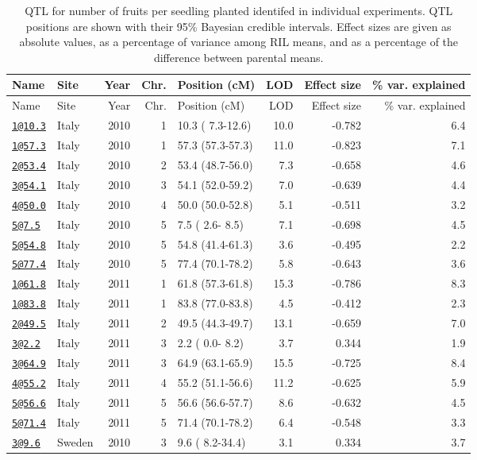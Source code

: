 \documentclass[]{article}
\begin{document}
\begin{longtable}[]{@{}llrrlrrr@{}}
\caption{QTL for number of fruits per seedling planted identifed in
individual experiments. QTL positions are shown with their 95\% Bayesian
credible intervals. Effect sizes are given as absolute values, as a
percentage of variance among RIL means, and as a percentage of the
difference between parental means.}\tabularnewline
\toprule
Name & Site & Year & Chr. & Position (cM) & LOD & Effect size & \% var.
explained\tabularnewline
\midrule
\endfirsthead
\toprule
Name & Site & Year & Chr. & Position (cM) & LOD & Effect size & \% var.
explained\tabularnewline
\midrule
\endhead
\href{mailto:1@10.3}{\nolinkurl{1@10.3}} & Italy & 2010 & 1 & 10.3 (
7.3-12.6) & 10.0 & -0.782 & 6.4\tabularnewline
\href{mailto:1@57.3}{\nolinkurl{1@57.3}} & Italy & 2010 & 1 & 57.3
(57.3-57.3) & 11.0 & -0.823 & 7.1\tabularnewline
\href{mailto:2@53.4}{\nolinkurl{2@53.4}} & Italy & 2010 & 2 & 53.4
(48.7-56.0) & 7.3 & -0.658 & 4.6\tabularnewline
\href{mailto:3@54.1}{\nolinkurl{3@54.1}} & Italy & 2010 & 3 & 54.1
(52.0-59.2) & 7.0 & -0.639 & 4.4\tabularnewline
\href{mailto:4@50.0}{\nolinkurl{4@50.0}} & Italy & 2010 & 4 & 50.0
(50.0-52.8) & 5.1 & -0.511 & 3.2\tabularnewline
\href{mailto:5@7.5}{\nolinkurl{5@7.5}} & Italy & 2010 & 5 & 7.5 ( 2.6-
8.5) & 7.1 & -0.698 & 4.5\tabularnewline
\href{mailto:5@54.8}{\nolinkurl{5@54.8}} & Italy & 2010 & 5 & 54.8
(41.4-61.3) & 3.6 & -0.495 & 2.2\tabularnewline
\href{mailto:5@77.4}{\nolinkurl{5@77.4}} & Italy & 2010 & 5 & 77.4
(70.1-78.2) & 5.8 & -0.643 & 3.6\tabularnewline
\href{mailto:1@61.8}{\nolinkurl{1@61.8}} & Italy & 2011 & 1 & 61.8
(57.3-61.8) & 15.3 & -0.786 & 8.3\tabularnewline
\href{mailto:1@83.8}{\nolinkurl{1@83.8}} & Italy & 2011 & 1 & 83.8
(77.0-83.8) & 4.5 & -0.412 & 2.3\tabularnewline
\href{mailto:2@49.5}{\nolinkurl{2@49.5}} & Italy & 2011 & 2 & 49.5
(44.3-49.7) & 13.1 & -0.659 & 7.0\tabularnewline
\href{mailto:3@2.2}{\nolinkurl{3@2.2}} & Italy & 2011 & 3 & 2.2 ( 0.0-
8.2) & 3.7 & 0.344 & 1.9\tabularnewline
\href{mailto:3@64.9}{\nolinkurl{3@64.9}} & Italy & 2011 & 3 & 64.9
(63.1-65.9) & 15.5 & -0.725 & 8.4\tabularnewline
\href{mailto:4@55.2}{\nolinkurl{4@55.2}} & Italy & 2011 & 4 & 55.2
(51.1-56.6) & 11.2 & -0.625 & 5.9\tabularnewline
\href{mailto:5@56.6}{\nolinkurl{5@56.6}} & Italy & 2011 & 5 & 56.6
(56.6-57.7) & 8.6 & -0.632 & 4.5\tabularnewline
\href{mailto:5@71.4}{\nolinkurl{5@71.4}} & Italy & 2011 & 5 & 71.4
(70.1-78.2) & 6.4 & -0.548 & 3.3\tabularnewline
\href{mailto:3@9.6}{\nolinkurl{3@9.6}} & Sweden & 2010 & 3 & 9.6 (
8.2-34.4) & 3.1 & 0.334 & 3.7\tabularnewline

\end{longtable}
\end{document}

